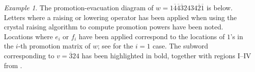 \documentclass{amsart}
\theoremstyle{definition}
\theoremstyle{remark}
\newtheorem{example}[theorem]{Example}
\numberwithin{equation}{section}
\begin{document}
\begin{example}\label{ex:promotion-evacuation}
The promotion-evacuation diagram of $w = 1\overline{4}\overline{4}\overline{3}2434\overline{2}\overline{1}$ is below. Letters where a raising or lowering operator has been applied when using the crystal raising algorithm to compute promotion powers have been noted. Locations where $e_i$ or $f_i$ have been applied correspond to the locations of $1$'s in the $i$-th promotion matrix of $w$; see  for the $i=1$ case. The subword corresponding to $v = \overline{3}24$ has been highlighted in bold, together with regions I--IV from .


\def\eone{\scriptstyle \textcolor{greenish}{e_1}}
\def\etwo{\scriptstyle \textcolor{orangish}{e_2}}
\def\ethree{\scriptstyle \textcolor{purplish}{e_3}}
\def\fone{\scriptstyle \textcolor{greenish}{f_1}}
\def\ftwo{\scriptstyle \textcolor{orangish}{f_2}}
\def\fthree{\scriptstyle \textcolor{purplish}{f_3}}


\end{example}
\end{document}

